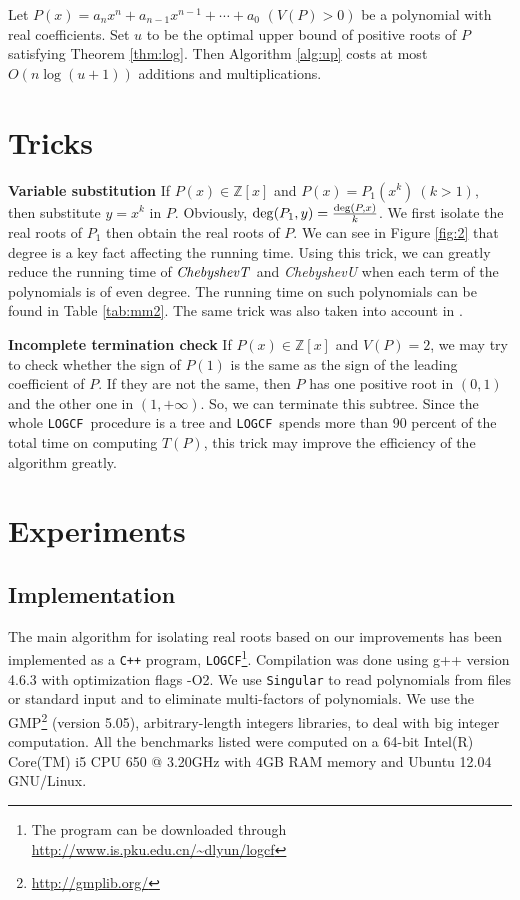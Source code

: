 \documentclass[10pt,a4paper]{article}
\def \froot {{\tt LOGCF}}
\def \ZZ {{\mathbb Z}}
\def \deg {{\rm deg}}
\begin{document}
\begin{corollary}
  Let $P(x)=a_nx^n+a_{n-1}x^{n-1}+\cdots+a_0$ $ (V(P)> 0)$ be a polynomial with real coefficients. Set $u$ to be the optimal upper bound of positive roots of $P$ satisfying Theorem
  \ref{thm:log}. Then  Algorithm \ref{alg:up} costs at most $O(n\log(u+1))$  additions and multiplications.
\end{corollary}


\section{Tricks}
{\bf Variable substitution}
If $P(x)\in \ZZ[x]$ and $P(x)=P_1(x^k)\ (k>1),$ then substitute $y=x^k$ in $P$. Obviously, $\deg(P_1,y)=\frac{\deg(P,x)}{k}$. We first isolate the real roots of $P_1$ then
obtain the real roots of $P$. We can see in Figure \ref{fig:2} that degree is a key fact affecting the running time. Using this trick, we can greatly reduce the running time of ${\it ChebyshevT}$
and {\it ChebyshevU} when each term of the polynomials is of even degree. The running time on such polynomials can be found in Table \ref{tab:mm2}. The same trick was also taken into account in \cite{johnson06}.

{\bf Incomplete termination check}
If $P(x)\in \ZZ[x]$ and $V(P)= 2$, we may try to check whether the sign of $P(1)$ is the same as the sign of the leading coefficient of $P$. If they are not the same, then $P$  has one positive root in $(0,1)$ and the other one in $(1,+\infty)$. So, we can terminate this subtree. Since the whole \froot\ procedure is a tree and \froot\ spends more than 90 percent of the
total time on computing $T(P)$, this trick may improve the efficiency of the algorithm greatly.

\section{Experiments }
\subsection{Implementation}
The main algorithm for isolating real roots based on our improvements has been implemented as a \texttt{C++} program, \froot \footnote{The program can be downloaded through \url{http://www.is.pku.edu.cn/~dlyun/logcf}}. Compilation was done using g++ version 4.6.3 with optimization flags -O2.
We use {\tt Singular} \cite{singular} to read polynomials from files or standard input and to eliminate multi-factors of polynomials. We use the GMP\footnote{ \url{http://gmplib.org/}}
(version 5.05), arbitrary-length integers libraries, to deal with big integer computation.
All the benchmarks listed were computed on a 64-bit Intel(R) Core(TM) i5 CPU 650 @ 3.20GHz with 4GB RAM memory and Ubuntu 12.04 GNU/Linux.
\end{document}
